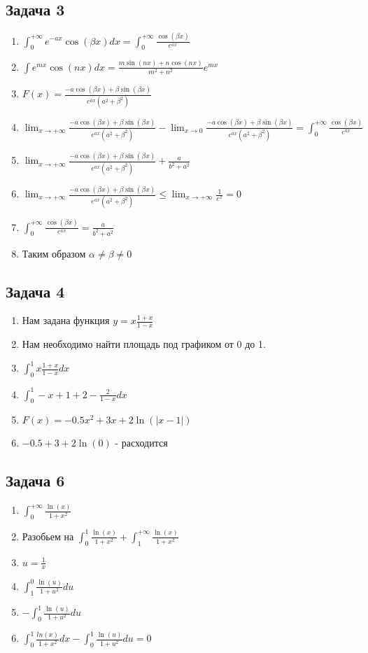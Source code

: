 \documentclass[a4paper,12pt]{article}
\begin{document}
\subsection{Задача 3}
\begin{enumerate}
    \item $\int_{0}^{+\infty} e^{-ax}\cos(\beta x)dx = \int_{0}^{+\infty} \frac{\cos(\beta x)}{e^{ax}}$
    \item $\int e^{mx} \cos(n x)  dx = \frac{m \sin(n x) + n \cos(n x)}{m^2 + n^2} e^{mx}$
    \item $F(x) = \frac{-a \cos(\beta x) + \beta \sin(\beta x)}{e^{a x} (a^2 + \beta^2)}$
    \item $\lim_{x \to +\infty} \frac{-a \cos(\beta x) + \beta \sin(\beta x)}{e^{a x} (a^2 + \beta^2)} - \lim_{x \to 0} \frac{-a \cos(\beta x) + \beta \sin(\beta x)}{e^{a x} (a^2 + \beta^2)} =  \int_{0}^{+\infty} \frac{\cos(\beta x)}{e^{ax}}$
    \item $\lim_{x \to +\infty} \frac{-a \cos(\beta x) + \beta \sin(\beta x)}{e^{a x} (a^2 + \beta^2)} + \frac{a}{b^2+a^2}$
    \item $\lim_{x \to +\infty} \frac{-a \cos(\beta x) + \beta \sin(\beta x)}{e^{a x} (a^2 + \beta^2)} \le \lim_{x \to +\infty} \frac{1}{e^x} = 0$
    \item $\int_{0}^{+\infty} \frac{\cos(\beta x)}{e^{ax}} = \frac{a}{b^2+a^2}$ 
    \item Таким образом $\alpha \ne \beta \ne 0$
\end{enumerate}

\subsection{Задача 4}
\begin{enumerate}
    \item Нам задана функция $y=x\frac{1+x}{1-x}$
    \item Нам необходимо найти площадь под графиком от 0 до 1.
    \item $\int_{0}^{1} x\frac{1+x}{1-x}dx$
    \item $\int_{0}^{1} -x+1 +2 -\frac{2}{1-x} dx$
    \item $F(x) = -0.5x^2+3x+2\ln(|x-1|)$
    \item $-0.5+3+2\ln(0) $ - расходится
\end{enumerate}

\subsection{Задача 6}
\begin{enumerate}
    \item $\int_{0}^{+\infty} \frac{\ln(x)}{1+x^2}$
    \item Разобьем на $\int_{0}^{1} \frac{\ln(x)}{1+x^2} + \int_{1}^{+\infty}\frac{\ln(x)}{1+x^2}$
    \item $u = \frac{1}{x}$
    \item $\int_{1}^{0}  \frac{\ln(u)}{1+u^2}du$
    \item $-\int_{0}^{1} \frac{\ln(u)}{1+u^2}du$
    \item $\int_{0}^{1}\frac{ln(x)}{1+x^2}dx - \int_{0}^{1} \frac{\ln(u)}{1+    u^2}du = 0$
\end{enumerate}
\end{document}
